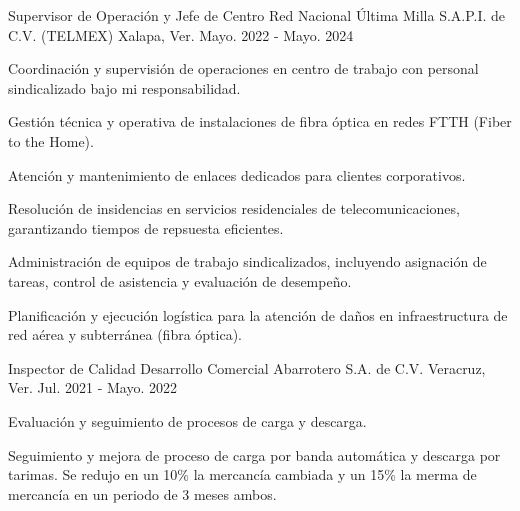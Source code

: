 

\begin{cventries}

  \cventry
    {Supervisor de Operación y Jefe de Centro} %
	{Red Nacional Última Milla S.A.P.I. de C.V. (TELMEX)} %
    {Xalapa, Ver.} %
    {Mayo. 2022 - Mayo. 2024} %
    {
      \begin{cvitems} %
        \item {Coordinación y supervisión de operaciones en centro de trabajo con personal sindicalizado bajo mi responsabilidad.}
		\item {Gestión técnica y operativa de instalaciones de fibra óptica en redes FTTH (Fiber to the Home).}
        \item {Atención y mantenimiento de enlaces dedicados para clientes corporativos.}
        \item {Resolución de insidencias en servicios residenciales de telecomunicaciones, garantizando tiempos de repsuesta eficientes.}
        \item {Administración de equipos de trabajo sindicalizados, incluyendo asignación de tareas, control de asistencia y evaluación de desempeño.}
        \item {Planificación y ejecución logística para la atención de daños en infraestructura de red aérea y subterránea (fibra óptica).}
      \end{cvitems}
    }
  \cventry
    {Inspector de Calidad} %
    {Desarrollo Comercial Abarrotero S.A. de C.V.} %
    {Veracruz, Ver.} %
    {Jul. 2021 - Mayo. 2022} %
    {
      \begin{cvitems} %
        \item {Evaluación y seguimiento de procesos de carga y descarga.}
		\item {Seguimiento y mejora de proceso de carga por banda automática y descarga por tarimas. Se redujo en un 10\% la mercancía cambiada y un 15\% la merma de mercancía en un periodo de 3 meses ambos.}

\end{cvitems}}
\end{cventries}
